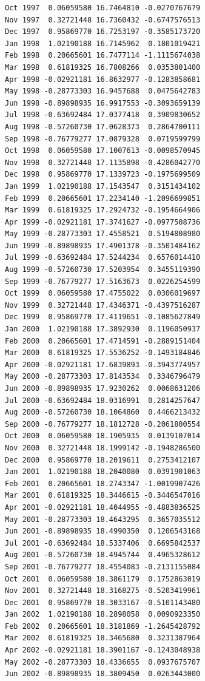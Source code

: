 \documentclass[
  11pt,
  a4paper,
]{report}
\begin{document}
\begin{verbatim}
Oct 1997  0.06059580 16.7464810 -0.0270767679
Nov 1997  0.32721448 16.7360432 -0.6747576513
Dec 1997  0.95869770 16.7253197 -0.3585173720
Jan 1998  1.02190188 16.7145962  0.1801019421
Feb 1998  0.20665601 16.7477114 -1.1115674038
Mar 1998  0.61819325 16.7808266  0.0353801400
Apr 1998 -0.02921181 16.8632977 -0.1283858681
May 1998 -0.28773303 16.9457688  0.0475642783
Jun 1998 -0.89898935 16.9917553 -0.3093659139
Jul 1998 -0.63692484 17.0377418  0.3909830652
Aug 1998 -0.57260730 17.0628373  0.2864700111
Sep 1998 -0.76779277 17.0879328  0.0719599799
Oct 1998  0.06059580 17.1007613 -0.0098570945
Nov 1998  0.32721448 17.1135898 -0.4286042770
Dec 1998  0.95869770 17.1339723 -0.1975699509
Jan 1999  1.02190188 17.1543547  0.3151434102
Feb 1999  0.20665601 17.2234140 -1.2096699851
Mar 1999  0.61819325 17.2924732 -0.1954664906
Apr 1999 -0.02921181 17.3741627 -0.0977508736
May 1999 -0.28773303 17.4558521  0.5194808980
Jun 1999 -0.89898935 17.4901378 -0.3501484162
Jul 1999 -0.63692484 17.5244234  0.6576014410
Aug 1999 -0.57260730 17.5203954  0.3455119390
Sep 1999 -0.76779277 17.5163673  0.0226254599
Oct 1999  0.06059580 17.4755022  0.0306019697
Nov 1999  0.32721448 17.4346371 -0.4397516287
Dec 1999  0.95869770 17.4119651 -0.1085627849
Jan 2000  1.02190188 17.3892930  0.1196050937
Feb 2000  0.20665601 17.4714591 -0.2889151404
Mar 2000  0.61819325 17.5536252 -0.1493184846
Apr 2000 -0.02921181 17.6839893 -0.3943774957
May 2000 -0.28773303 17.8143534  0.3346796479
Jun 2000 -0.89898935 17.9230262  0.0068631206
Jul 2000 -0.63692484 18.0316991  0.2814257647
Aug 2000 -0.57260730 18.1064860  0.4466213432
Sep 2000 -0.76779277 18.1812728 -0.2061800554
Oct 2000  0.06059580 18.1905935  0.0139107014
Nov 2000  0.32721448 18.1999142 -0.1948286500
Dec 2000  0.95869770 18.2019611  0.2753412107
Jan 2001  1.02190188 18.2040080  0.0391901063
Feb 2001  0.20665601 18.2743347 -1.0019907426
Mar 2001  0.61819325 18.3446615 -0.3446547016
Apr 2001 -0.02921181 18.4044955 -0.4883836525
May 2001 -0.28773303 18.4643295  0.3657035512
Jun 2001 -0.89898935 18.4990350  0.1206543168
Jul 2001 -0.63692484 18.5337406  0.6695842537
Aug 2001 -0.57260730 18.4945744  0.4965328612
Sep 2001 -0.76779277 18.4554083 -0.2131155084
Oct 2001  0.06059580 18.3861179  0.1752863019
Nov 2001  0.32721448 18.3168275 -0.5203419961
Dec 2001  0.95869770 18.3033167 -0.5101143480
Jan 2002  1.02190188 18.2898058  0.0090923350
Feb 2002  0.20665601 18.3181869 -1.2645428792
Mar 2002  0.61819325 18.3465680  0.3231387964
Apr 2002 -0.02921181 18.3901167 -0.1243048938
May 2002 -0.28773303 18.4336655  0.0937675707
Jun 2002 -0.89898935 18.3809450  0.0263443000

\end{verbatim}
\end{document}
